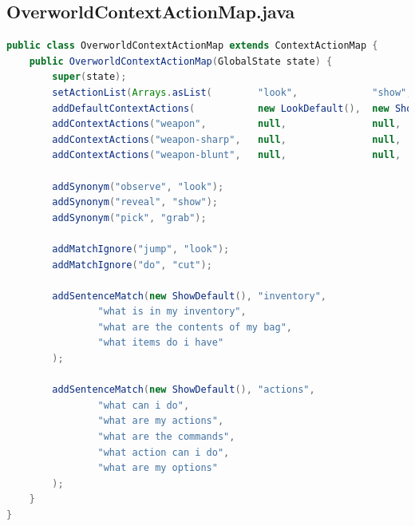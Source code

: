 \documentclass[11pt]{article}
\begin{document}
\subsection{OverworldContextActionMap.java}
\label{appendix:overworld-context-action-map}
\begin{lstlisting}[language=Java, caption=OverworldContextActionMap]
public class OverworldContextActionMap extends ContextActionMap {
    public OverworldContextActionMap(GlobalState state) {
        super(state);
        setActionList(Arrays.asList(        "look",             "show",             "grab",             "open",             "cut",                      "break"));
        addDefaultContextActions(           new LookDefault(),  new ShowDefault(),  new GrabObject(),   new OpenObject(),   new CutDefault(),           new BreakDefault());
        addContextActions("weapon",         null,               null,               new GrabObject(),   new OpenObject(),   new CutWeaponNotSharp(),    new BreakWeaponNotBlunt());
        addContextActions("weapon-sharp",   null,               null,               new GrabObject(),   new OpenObject(),   new CutWeaponSharp(),       new BreakWeaponNotBlunt());
        addContextActions("weapon-blunt",   null,               null,               new GrabObject(),   new OpenObject(),   new CutWeaponNotSharp(),    new BreakWeaponBlunt());

        addSynonym("observe", "look");
        addSynonym("reveal", "show");
        addSynonym("pick", "grab");

        addMatchIgnore("jump", "look");
        addMatchIgnore("do", "cut");

        addSentenceMatch(new ShowDefault(), "inventory",
                "what is in my inventory",
                "what are the contents of my bag",
                "what items do i have"
        );

        addSentenceMatch(new ShowDefault(), "actions",
                "what can i do",
                "what are my actions",
                "what are the commands",
                "what action can i do",
                "what are my options"
        );
    }
}
\end{lstlisting}

\newpage
{}

\end{document}
